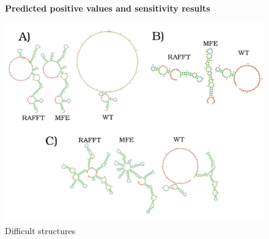 \documentclass[a4paper,12pt]{article}
\begin{document}
{{\begin{figure}[!ht]
  \centering
  \\
  \caption{\textbf{Predicted positive values and sensitivity results}}
\end{figure}

\begin{figure}[htbp]
\centering
\includegraphics[width=.9\linewidth]{img/comb_rna_struct.png}
\caption{Difficult structures}
\end{figure}

}}
\end{document}
